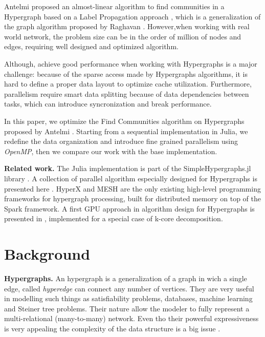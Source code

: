 \documentclass[conference]{IEEEtran}
\newcommand{\mypar}[1]{{\bf #1.}}
\begin{document}
Antelmi proposed an almost-linear algorithm to find communities in a Hypergraph based on a Label Propagation approach \cite{SimpleHypergraphs}, which is a generalization of the graph algorithm proposed by Raghavan \cite{LP_standard}. However,when working with real world network, the problem size can be in the order of million of nodes and edges, requiring well designed and optimized algorithm.

Although, achieve good performance when working with Hypergraphs is a major challenge: because of the sparse access made by Hypergraphs algorithms, it is hard to define a proper data layout to optimize cache utilization. Furthermore, parallelism require smart data splitting because of data dependencies between tasks, which can introduce syncronization and break performance.

In this paper, we optimize the Find Communities algorithm on Hypergraphs proposed by Antelmi \cite{SimpleHypergraphs}. Starting from a sequential implementation in Julia, we redefine the data organization and introduce fine grained parallelism using \textit{OpenMP}, then we compare our work with the base implementation.

\mypar{Related work} 
The Julia implementation is part of the SimpleHypergraphs.jl library \cite{SH.jl}. A collection of parallel algorithm especially designed for Hypergraphs is presented here \cite{parallel_alg}. HyperX \cite{HYPERX} and MESH \cite{MESH} are the only existing high-level programming frameworks for hypergraph processing, built for distributed memory on top of the Spark framework. A first GPU approach in algorithm design for Hypergraphs is presented in \cite{gpu_alg}, implemented for a special case of k-core decomposition.

\section{Background}\label{sec:background}

\mypar{Hypergraphs}
An hypergraph is a generalization of a graph in wich a single edge, called \textit{hyperedge} can connect any number of vertices. They are very useful in modelling such things as satisfiability problems, databases, machine learning and Steiner tree problems. Their nature allow the modeler to fully represent a multi-relational (many-to-many) network.
Even tho their powerful expressiveness is very appealing the complexity of the data structure is a big issue\cite {SystemFrontiers} \cite{PhysicalReview}.
\end{document}
